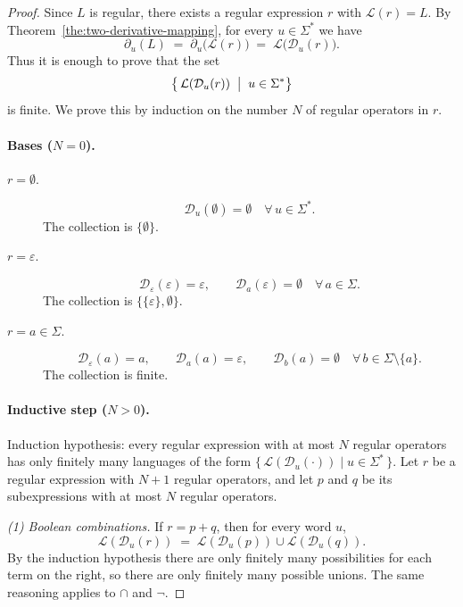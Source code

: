 \begin{proof}
Since $L$ is regular, there exists a regular expression $r$ with $\mathcal{L}(r)=L$.
By Theorem~\ref{the:two-derivative-mapping}, for every $u\in\Sigma^*$ we have
\[
   \partial_u(L) \;=\; \partial_u\bigl(\mathcal{L}(r)\bigr)
   \;=\; \mathcal{L}\!\bigl(\mathcal{D}_u(r)\bigr).
\]
Thus it is enough to prove that the set
\[
  \bigl\{\, \mathcal{L}(\mathcal{D}_u(r)) \;\bigm|\; u\in\Sigma^* \bigr\}
\]
is finite. We prove this by induction on the number \(N\) of regular operators in \(r\).

\paragraph{Bases (\(N=0\)).}
\begin{description}
  \item[\(r=\emptyset\).]
  \[
    \mathcal{D}_u(\emptyset)=\emptyset \quad \forall\, u\in\Sigma^*.
  \]
  The collection is \( \{\emptyset\} \).

  \item[\(r=\varepsilon\).]
  \[
    \mathcal{D}_\varepsilon(\varepsilon)=\varepsilon,
    \qquad
    \mathcal{D}_a(\varepsilon)=\emptyset \quad \forall\, a\in\Sigma.
  \]
  The collection is \( \{\{\varepsilon\},\emptyset\} \).

  \item[\(r=a\in\Sigma\).]
  \[
    \mathcal{D}_\varepsilon(a)=a,
    \qquad
    \mathcal{D}_a(a)=\varepsilon,
    \qquad
    \mathcal{D}_b(a)=\emptyset \quad \forall\, b\in\Sigma\setminus\{a\}.
  \]
  The collection is finite.
\end{description}

\paragraph{Inductive step (\(N>0\)).}
Induction hypothesis: every regular expression with at most \(N\) regular operators has only finitely many languages of the form \(\{\,\mathcal{L}(\mathcal{D}_u(\cdot)) \mid u\in\Sigma^*\,\}\).
Let \(r\) be a regular expression with \(N+1\) regular operators, and let \(p\) and \(q\) be its subexpressions with at most \(N\) regular operators.

\smallskip
\emph{(1) Boolean combinations.}
If \(r=p+q\), then for every word \(u\),
\[
  \mathcal{L}(\mathcal{D}_u(r))
  \;=\;
  \mathcal{L}(\mathcal{D}_u(p)) \cup \mathcal{L}(\mathcal{D}_u(q)).
\]
By the induction hypothesis there are only finitely many possibilities for each term on the right, so there are only finitely many possible unions. The same reasoning applies to $\cap$ and $\neg$.


\end{proof}

